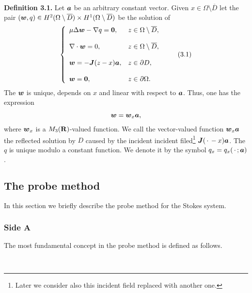 {\bf\noindent Definition 3.1.}
Let $\mbox{\boldmath $a$}$ be an arbitrary constant vector.
Given $x\in\Omega\setminus\overline{D}$ let the pair $(\mbox{\boldmath $w$},q)\in H^2(\Omega\setminus\overline{D})\times H^1(\Omega\setminus\overline{D})$ be
the solution of
$$\left\{
 \begin{array}{ll}
 \mu\Delta\mbox{\boldmath $w$}-\nabla q=\mbox{\boldmath $0$}, & z\in\Omega\setminus\overline{D},
 \\
 \\
 \displaystyle
 \nabla\cdot\mbox{\boldmath $w$}=0, &  z\in\Omega\setminus\overline{D},\\
 \\
 \displaystyle
 \mbox{\boldmath $w$}=-\mbox{\boldmath $J$}(z-x)\mbox{\boldmath $a$}, & z\in\partial D,
 \\
 \\
 \displaystyle
 \mbox{\boldmath $w$}=\mbox{\boldmath $0$}, & z\in\partial\Omega.
 \end{array}
 \right.
 \tag {3.1}
 $$
The $\mbox{\boldmath $w$}$ is unique, depends on $x$ and linear with respect to $\mbox{\boldmath $a$}$.
Thus, one has the expression
 $$\displaystyle
 \mbox{\boldmath $w$}=\mbox{\boldmath $w$}_x\mbox{\boldmath $a$},
 $$
 where $\mbox{\boldmath $w$}_x$ is a $M_3(\Bbb R)$-valued function.  We call the vector-valued function
 $\mbox{\boldmath $w$}_x\mbox{\boldmath $a$}$ the reflected solution by $D$ caused by the incident incident filed\footnote{
 Later we consider also this incident field replaced with another one.} $\mbox{\boldmath $J$}(\,\cdot\,-x)\mbox{\boldmath $a$}$.
 The $q$ is unique modulo a constant function.  We denote it by the symbol $q_x=q_x(\,\cdot\,;\mbox{\boldmath $a$})$.


  

\subsection{The probe method}

In this section we briefly describe the probe method for the Stokes system.


\subsubsection{Side A}



The most fundamental concept in the probe method is defined as follows.

$\quad$

